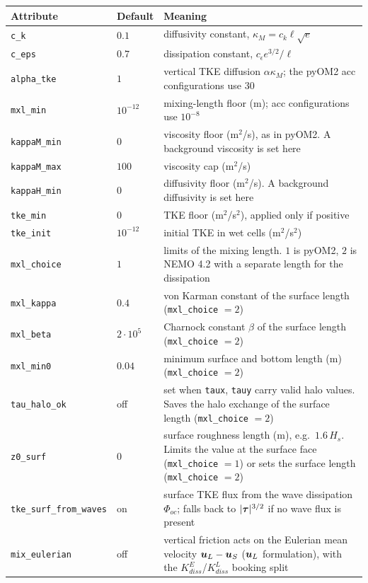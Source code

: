 \documentclass[12pt]{article}
\renewcommand{\v}[1]{{\mbox{\boldmath$ #1 $}}}  %
\begin{document}
\begin{longtable}{@{}llp{8.2cm}@{}}
\hline
Attribute & Default & Meaning \\
\hline
\endhead
\verb|c_k| & $0.1$ & diffusivity constant, $\kappa_M = c_k \ell \sqrt{e}$ \\
\verb|c_eps| & $0.7$ & dissipation constant, $c_\epsilon e^{3/2}/\ell$ \\
\verb|alpha_tke| & $1$ & vertical TKE diffusion $\alpha \kappa_M$; the pyOM2
  acc configurations use $30$ \\
\verb|mxl_min| & $10^{-12}$ & mixing-length floor (m); acc configurations use
  $10^{-8}$ \\
\verb|kappaM_min| & $0$ & viscosity floor (m$^2$/s), as in pyOM2. A background
  viscosity is set here \\
\verb|kappaM_max| & $100$ & viscosity cap (m$^2$/s) \\
\verb|kappaH_min| & $0$ & diffusivity floor (m$^2$/s). A background
  diffusivity is set here \\
\verb|tke_min| & $0$ & TKE floor (m$^2$/s$^2$), applied only if positive \\
\verb|tke_init| & $10^{-12}$ & initial TKE in wet cells (m$^2$/s$^2$) \\
\verb|mxl_choice| & $1$ & limits of the mixing length. $1$ is pyOM2,
  $2$ is NEMO 4.2 with a separate length for the dissipation \\
\verb|mxl_kappa| & $0.4$ & von Karman constant of the surface length
  (\verb|mxl_choice| $=2$) \\
\verb|mxl_beta| & $2\cdot 10^5$ & Charnock constant $\beta$ of the surface
  length (\verb|mxl_choice| $=2$) \\
\verb|mxl_min0| & $0.04$ & minimum surface and bottom length (m)
  (\verb|mxl_choice| $=2$) \\
\verb|tau_halo_ok| & off & set when \verb|taux|, \verb|tauy| carry valid halo
  values. Saves the halo exchange of the surface length
  (\verb|mxl_choice| $=2$) \\
\verb|z0_surf| & $0$ & surface roughness length (m), e.g.\ $1.6\,H_s$.
  Limits the value at the surface face (\verb|mxl_choice| $=1$) or sets the
  surface length (\verb|mxl_choice| $=2$) \\
\verb|tke_surf_from_waves| & on & surface TKE flux from the wave dissipation
  $\Phi_{oc}$; falls back to $|\v \tau|^{3/2}$ if no wave flux is present \\
\verb|mix_eulerian| & off & vertical friction acts on the Eulerian mean
  velocity $\v u_L - \v u_S$ ($\v u_L$ formulation), with the
  $K_{diss}^E$/$K_{diss}^L$ booking split \\
\hline
\end{longtable}
\end{document}

